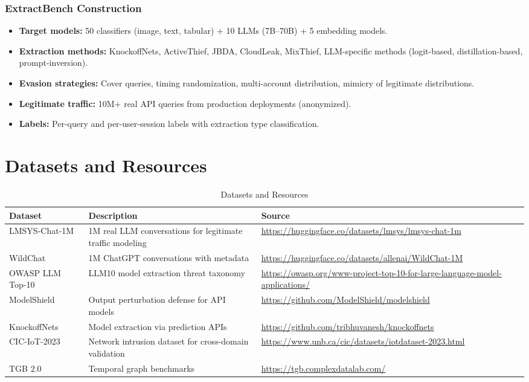 \documentclass[12pt,a4paper]{article}
\begin{document}
\subsubsection{ExtractBench Construction}

\begin{itemize}
    \item \textbf{Target models:} 50 classifiers (image, text, tabular) + 10 LLMs (7B--70B) + 5 embedding models.
    \item \textbf{Extraction methods:} KnockoffNets, ActiveThief, JBDA, CloudLeak, MixThief, LLM-specific methods (logit-based, distillation-based, prompt-inversion).
    \item \textbf{Evasion strategies:} Cover queries, timing randomization, multi-account distribution, mimicry of legitimate distributions.
    \item \textbf{Legitimate traffic:} 10M+ real API queries from production deployments (anonymized).
    \item \textbf{Labels:} Per-query and per-user-session labels with extraction type classification.
\end{itemize}

\section{Datasets and Resources}

\begin{table}[H]
\centering
\caption{Datasets and Resources}
\begin{tabularx}{\textwidth}{@{}lXl@{}}
\toprule
\textbf{Dataset} & \textbf{Description} & \textbf{Source} \\
\midrule
LMSYS-Chat-1M & 1M real LLM conversations for legitimate traffic modeling & \url{https://huggingface.co/datasets/lmsys/lmsys-chat-1m} \\
\addlinespace
WildChat & 1M ChatGPT conversations with metadata & \url{https://huggingface.co/datasets/allenai/WildChat-1M} \\
\addlinespace
OWASP LLM Top-10 & LLM10 model extraction threat taxonomy & \url{https://owasp.org/www-project-top-10-for-large-language-model-applications/} \\
\addlinespace
ModelShield & Output perturbation defense for API models & \url{https://github.com/ModelShield/modelshield} \\
\addlinespace
KnockoffNets & Model extraction via prediction APIs & \url{https://github.com/tribhuvanesh/knockoffnets} \\
\addlinespace
CIC-IoT-2023 & Network intrusion dataset for cross-domain validation & \url{https://www.unb.ca/cic/datasets/iotdataset-2023.html} \\
\addlinespace
TGB 2.0 & Temporal graph benchmarks & \url{https://tgb.complexdatalab.com/} \\
\bottomrule
\end{tabularx}
\end{table}
\end{document}
